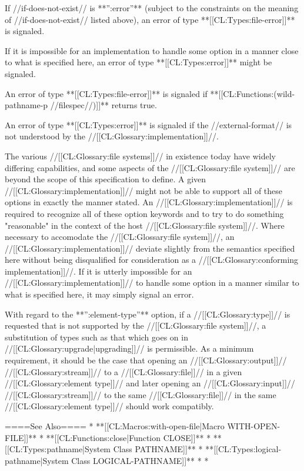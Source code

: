 If //if-does-not-exist// is **'':error''** (subject to the constraints on the meaning of //if-does-not-exist// listed above), an error of type **[[CL:Types:file-error]]** is signaled.

If it is impossible for an implementation to handle some option in a manner close to what is specified here, an error of type **[[CL:Types:error]]** might be signaled.

An error of type **[[CL:Types:file-error]]** is signaled if **[[CL:Functions:(wild-pathname-p //filespec//)]]** returns true.

An error of type **[[CL:Types:error]]** is signaled if the //external-format// is not understood by the //[[CL:Glossary:implementation]]//.

The various //[[CL:Glossary:file systems]]// in existence today have widely differing capabilities, and some aspects of the //[[CL:Glossary:file system]]// are beyond the scope of this specification to define. A given //[[CL:Glossary:implementation]]// might not be able to support all of these options in exactly the manner stated. An //[[CL:Glossary:implementation]]// is required to recognize all of these option keywords and to try to do something "reasonable" in the context of the host //[[CL:Glossary:file system]]//. Where necessary to accomodate the //[[CL:Glossary:file system]]//, an //[[CL:Glossary:implementation]]// deviate slightly from the semantics specified here without being disqualified for consideration as a //[[CL:Glossary:conforming implementation]]//. If it is utterly impossible for an //[[CL:Glossary:implementation]]// to handle some option in a manner similar to what is specified here, it may simply signal an error.

With regard to the **'':element-type''** option, if a //[[CL:Glossary:type]]// is requested that is not supported by the //[[CL:Glossary:file system]]//, a substitution of types such as that which goes on in //[[CL:Glossary:upgrade|upgrading]]// is permissible. As a minimum requirement, it should be the case that opening an //[[CL:Glossary:output]]// //[[CL:Glossary:stream]]// to a //[[CL:Glossary:file]]// in a given //[[CL:Glossary:element type]]// and later opening an //[[CL:Glossary:input]]// //[[CL:Glossary:stream]]// to the same //[[CL:Glossary:file]]// in the same //[[CL:Glossary:element type]]// should work compatibly.

====See Also====
  * **[[CL:Macros:with-open-file|Macro WITH-OPEN-FILE]]**
  * **[[CL:Functions:close|Function CLOSE]]**
  * **[[CL:Types:pathname|System Class PATHNAME]]**
  * **[[CL:Types:logical-pathname|System Class LOGICAL-PATHNAME]]**
  * {\secref\MergingPathnames}
  * {\secref\PathnamesAsFilenames}

